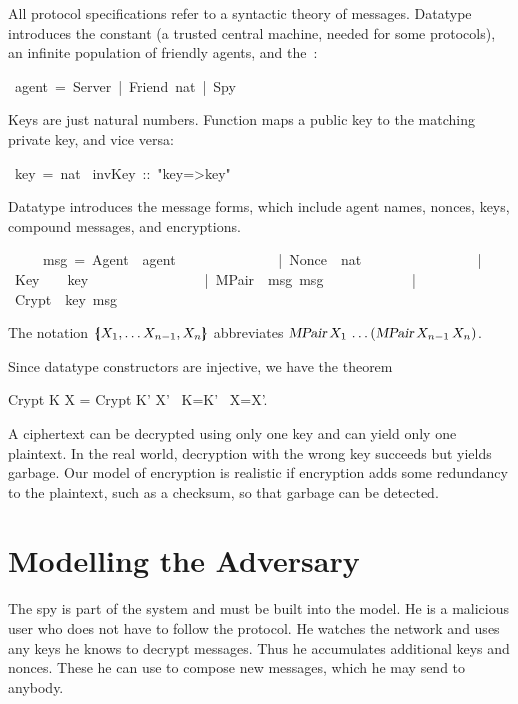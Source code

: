 All protocol specifications refer to a syntactic theory of messages. 
Datatype
 introduces the constant  (a trusted central
machine, needed for some protocols), an infinite population of
friendly agents, and the~:
\begin{isabelle}
\ agent\ =\ Server\ |\ Friend\ nat\ |\ Spy
\end{isabelle}
%
Keys are just natural numbers.  Function  maps a public key to
the matching private key, and vice versa:
\begin{isabelle}
\ key\ =\ nat\isanewline
{}\ invKey\ ::\ "key=>key"
\end{isabelle}
Datatype
 introduces the message forms, which include agent names, nonces,
keys, compound messages, and encryptions.  
\begin{isabelle}
\isanewline
\ \ \ \ \ msg\ =\ Agent\ \ agent\ \ \ \ \ \isanewline
\ \ \ \ \ \ \ \ \ |\ Nonce\ \ nat\ \ \ \ \ \ \ \isanewline
\ \ \ \ \ \ \ \ \ |\ Key\ \ \ \ key\ \ \ \ \ \ \ \isanewline
\ \ \ \ \ \ \ \ \ |\ MPair\ \ msg\ msg\ \ \ \isanewline
\ \ \ \ \ \ \ \ \ |\ Crypt\ \ key\ msg\ \ \ \isanewline
\end{isabelle}
%
The notation $\mathopen{\{\kern-.30em|} X\sb 1,\ldots X\sb{n-1},X\sb n\mathclose{|\kern-.32em\}}$
abbreviates
$\emph{\sl MPair}\,X\sb 1\,\ldots\allowbreak(\emph{\sl MPair}\,X\sb{n-1}\,X\sb n)$.

Since datatype constructors are injective, we have the theorem
\begin{isabelle}
Crypt K X = Crypt K' X' \isasymLongrightarrow\ K=K' \isasymand\ X=X'.
\end{isabelle}
A ciphertext can be decrypted using only one key and
can yield only one plaintext.  In the real world, decryption with the
wrong key succeeds but yields garbage.  Our model of encryption is
realistic if encryption adds some redundancy to the plaintext, such as a
checksum, so that garbage can be detected.


\section{Modelling the Adversary}

The spy is part of the system and must be built into the model.  He is
a malicious user who does not have to follow the protocol.  He
watches the network and uses any keys he knows to decrypt messages.
Thus he accumulates additional keys and nonces.  These he can use to
compose new messages, which he may send to anybody.  

